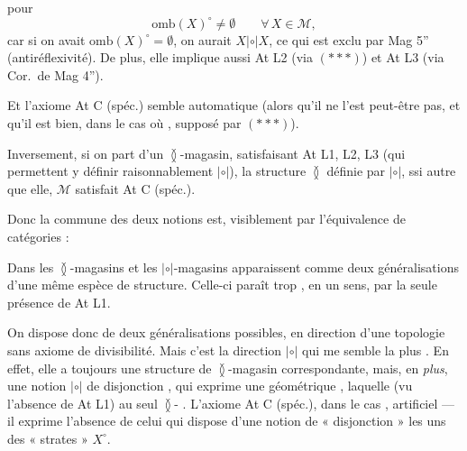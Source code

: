 \documentclass[11pt,a4paper]{article}
\begin{document}
pour
\[
  \mathrm{omb}(X)^{\circ} \neq \emptyset \qquad \forall\, X \in \mathcal{M},
\]
car si on avait $\mathrm{omb}(X)^{\circ} = \emptyset$, on aurait $X \mathrel{|{\circ}|} X$, ce qui est exclu par Mag 5'' (antiréflexivité). De plus, elle implique aussi At L2 (via $(***)$) et At L3 (via  Cor.\ de Mag 4'').

Et l'axiome At C (spéc.) semble automatique (alors qu'il ne l'est peut-être pas, et qu'il est bien, dans le cas où \ill{} \ill{}, supposé par $(***)$).

Inversement, si on part d'un $\between$-magasin, satisfaisant At L1, L2, L3 (qui permettent y définir raisonnablement $\mathrm{|{\circ}|}$), la structure $\between$ \ill{} \struck{\ill{}}  définie par $\mathrel{|{\circ}|}$, ssi autre que elle, \ill{} $\mathcal{M}$ satisfait At C (spéc.).

Donc la  \ill{} commune des deux notions est, visiblement \ill{} par l'équivalence de catégories :



Dans les $\between$-magasins et les $\mathrel{|{\circ}|}$-magasins apparaissent comme deux  généralisations d'une même espèce de structure. Celle-ci paraît trop  \ill{}, en un sens, par la seule présence de At L1.

On dispose donc de deux généralisations possibles, en direction d'une topologie sans axiome de divisibilité. Mais c'est la direction $\mathrel{|{\circ}|}$ qui me semble la plus . En effet, elle a toujours une structure de $\between$-magasin correspondante, mais, en \emph{plus}, une notion $\mathrel{|{\circ}|}$ de disjonction , qui exprime une  géométrique , laquelle  (vu l'absence de At L1) au seul $\between$- \ill{}. L'axiome At C (spéc.), dans le cas ,  artificiel --- il exprime \ill{} l'absence de \ill{} celui qui \ill{} dispose d'une notion de « disjonction » \ill{} les uns des  « strates » \ill{} $X^{\circ}$.
\end{document}
